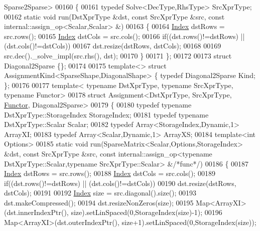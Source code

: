 \begin{DoxyCode}
      Sparse2Sparse>
00160 \{
00161   \textcolor{keyword}{typedef} Solve<DecType,RhsType> SrcXprType;
00162   \textcolor{keyword}{static} \textcolor{keywordtype}{void} run(DstXprType &dst, \textcolor{keyword}{const} SrcXprType &src, \textcolor{keyword}{const} internal::assign\_op<Scalar,Scalar> &)
00163   \{
00164     \hyperlink{namespace_eigen_a62e77e0933482dafde8fe197d9a2cfde}{Index} dstRows = src.rows();
00165     \hyperlink{namespace_eigen_a62e77e0933482dafde8fe197d9a2cfde}{Index} dstCols = src.cols();
00166     \textcolor{keywordflow}{if}((dst.rows()!=dstRows) || (dst.cols()!=dstCols))
00167       dst.resize(dstRows, dstCols);
00168 
00169     src.dec().\_solve\_impl(src.rhs(), dst);
00170   \}
00171 \};
00172 
00173 \textcolor{keyword}{struct }Diagonal2Sparse \{\};
00174 
00175 \textcolor{keyword}{template}<> \textcolor{keyword}{struct }AssignmentKind<SparseShape,DiagonalShape> \{ \textcolor{keyword}{typedef} Diagonal2Sparse Kind; \};
00176 
00177 \textcolor{keyword}{template}< \textcolor{keyword}{typename} DstXprType, \textcolor{keyword}{typename} SrcXprType, \textcolor{keyword}{typename} Functor>
00178 \textcolor{keyword}{struct }Assignment<DstXprType, SrcXprType, \hyperlink{struct_functor}{Functor}, Diagonal2Sparse>
00179 \{
00180   \textcolor{keyword}{typedef} \textcolor{keyword}{typename} DstXprType::StorageIndex StorageIndex;
00181   \textcolor{keyword}{typedef} \textcolor{keyword}{typename} DstXprType::Scalar Scalar;
00182   \textcolor{keyword}{typedef} Array<StorageIndex,Dynamic,1> ArrayXI;
00183   \textcolor{keyword}{typedef} Array<Scalar,Dynamic,1> ArrayXS;
00184   \textcolor{keyword}{template}<\textcolor{keywordtype}{int} Options>
00185   \textcolor{keyword}{static} \textcolor{keywordtype}{void} run(SparseMatrix<Scalar,Options,StorageIndex> &dst, \textcolor{keyword}{const} SrcXprType &src, \textcolor{keyword}{const} 
      internal::assign\_op<typename DstXprType::Scalar,typename SrcXprType::Scalar> &\textcolor{comment}{/*func*/})
00186   \{
00187     \hyperlink{namespace_eigen_a62e77e0933482dafde8fe197d9a2cfde}{Index} dstRows = src.rows();
00188     \hyperlink{namespace_eigen_a62e77e0933482dafde8fe197d9a2cfde}{Index} dstCols = src.cols();
00189     \textcolor{keywordflow}{if}((dst.rows()!=dstRows) || (dst.cols()!=dstCols))
00190       dst.resize(dstRows, dstCols);
00191 
00192     \hyperlink{namespace_eigen_a62e77e0933482dafde8fe197d9a2cfde}{Index} size = src.diagonal().size();
00193     dst.makeCompressed();
00194     dst.resizeNonZeros(size);
00195     Map<ArrayXI>(dst.innerIndexPtr(), size).setLinSpaced(0,StorageIndex(size)-1);
00196     Map<ArrayXI>(dst.outerIndexPtr(), size+1).setLinSpaced(0,StorageIndex(size));

\end{DoxyCode}
